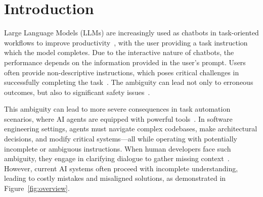 \section{Introduction}
\label{sec:Introduction}


Large Language Models (LLMs) are increasingly used as chatbots in task-oriented workflows to improve productivity~\cite{peng2023impactaideveloperproductivity, NBERw31161}, with the user providing a task instruction which the model completes. 
Due to the interactive nature of chatbots, the performance depends on the information provided in the user's prompt. Users often provide non-descriptive instructions, which poses critical challenges in successfully completing the task~\cite{SWE_Bench_Verified}. The ambiguity can lead not only to erroneous outcomes, but also to significant safety issues~\cite{kim2024aligninglanguagemodelsexplicitly, karli2023extended}. 


This ambiguity can lead to more severe consequences in task automation scenarios, where AI agents are equipped with powerful tools~\cite{wang2024openhandsopenplatformai,lu2024aiscientistfullyautomated,huang2024agentcodermultiagentbasedcodegeneration,zhou2024haicosystem}. In software engineering settings, agents must navigate complex codebases, make architectural decisions, and modify critical systems—all while operating with potentially incomplete or ambiguous instructions. When human developers face such ambiguity, they engage in clarifying dialogue to gather missing context~\cite{testoni_humansaskquestions, purver2004clarification}. However, current AI systems often proceed with incomplete understanding, leading to costly mistakes and misaligned solutions, as demonstrated in Figure~\ref{fig:overview}. 

